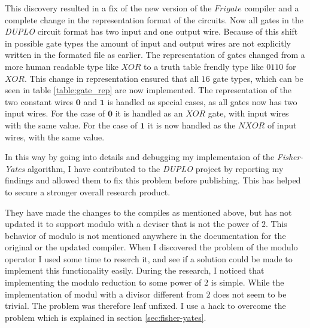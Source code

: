 \documentclass[twoside,11pt,openright]{report}
\newcommand{\FY}{\textit{Fisher-Yates} }
\newcommand{\DUPLO}{\textit{DUPLO} }
\begin{document}
\bigskip

\begin{table}
\centering
{}
\caption{A table of the 16 different gate types, that can be used in a circuit of the type used in \DUPLO}
\label{table:gate_rep}
\end{table}


This discovery resulted in a fix of the new version of the $Frigate$ compiler and a complete change in the representation format of the circuits. Now all gates in the \DUPLO circuit format has two input and one output wire. Because of this shift in possible gate types the amount of input and output wires are not explicitly written in the formated file as earlier. The representation of gates changed from a more human readable type like $XOR$ to a truth table frendly type like $0110$ for $XOR$. This change in representation ensured that all $16$ gate types, which can be seen in table \ref{table:gate_rep} are now implemented. The representation of the two constant wires $\textbf{0}$ and $\textbf{1}$ is handled as special cases, as all gates now has two input wires. For the case of $\textbf{0}$ it is handled as an $XOR$ gate, with input wires with the same value. For the case of $\textbf{1}$ it is now handled as the $NXOR$ of input wires, with the same value.

In this way by going into details and debugging my implementaion of the \FY algorithm, I have contributed to the \DUPLO project by reporting my findings and allowed them to fix this problem before publishing. This has helped to secure a stronger overall research product.

They have made the changes to the compiles as mentioned above, but has not updated it to support modulo with a deviser that is not the power of $2$. This behavior of modulo is not mentioned anywhere in the documentation for the original or the updated compiler. When I discovered the problem of the modulo operator I used some time to reserch it, and see if a solution could be made to implement this functionality easily. During the research, I noticed that implementing the modulo reduction to some power of $2$ is simple. While the implementation of modul with a divisor different from $2$ does not seem to be trivial. The problem was therefore leaf unfixed. I use a hack to overcome the problem which is explained in section \ref{sec:fisher-yates}.
\end{document}
